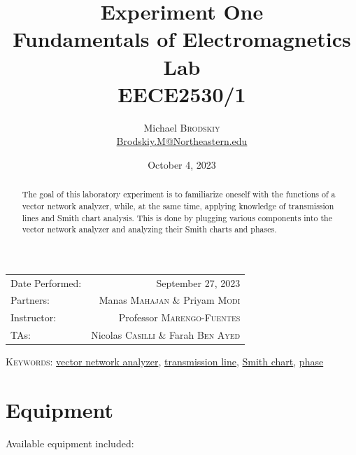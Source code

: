 \documentclass[
	letterpaper, %
	10pt, %
]{CSUniSchoolLabReport}
\title{Experiment One\\ Fundamentals of Electromagnetics Lab \\ EECE2530/1} %
\author{Michael \textsc{Brodskiy}\\ \small \href{mailto:Brodskiy.M@Northeastern.edu}{Brodskiy.M@Northeastern.edu}}
\date{October 4, 2023} %
\begin{document}
\maketitle %

\begin{center}
	\begin{tabular}{l r}
		Date Performed: & September 27, 2023 \\ %
        Partners: & Manas \textsc{Mahajan} \& Priyam \textsc{Modi} \\ %
		Instructor: & Professor \textsc{Marengo-Fuentes} \\ %
        TAs: & Nicolas \textsc{Casilli} \& Farah \textsc{Ben Ayed} \\ %
	\end{tabular}
\end{center}

\newpage

\begin{abstract}

  The goal of this laboratory experiment is to familiarize oneself with the functions of a vector network analyzer, while, at the same time, applying knowledge of transmission lines and Smith chart analysis. This is done by plugging various components into the vector network analyzer and analyzing their Smith charts and phases.

\end{abstract}

\begin{flushleft}

  \textsc{Keywords:} \underline{vector network analyzer}, \underline{transmission line}, \underline{Smith chart}, \underline{phase}

\end{flushleft}

\newpage

\section{Equipment}

\hspace{.5 in} Available equipment included:\\
\end{document}
